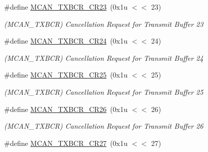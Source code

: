 \begin{DoxyCompactItemize}
\mbox{\label{group__SAME70__MCAN_gaf03469cd3780aad36986d2fe5558bab8}} 
\#define \mbox{\hyperlink{group__SAME70__MCAN_gaf03469cd3780aad36986d2fe5558bab8}{M\+C\+A\+N\+\_\+\+T\+X\+B\+C\+R\+\_\+\+C\+R23}}~(0x1u $<$$<$ 23)
\begin{DoxyCompactList}\small\item\em (M\+C\+A\+N\+\_\+\+T\+X\+B\+CR) Cancellation Request for Transmit Buffer 23 \end{DoxyCompactList}\item 
\mbox{\label{group__SAME70__MCAN_ga87a6441da81829d40259923fbcc69c5f}} 
\#define \mbox{\hyperlink{group__SAME70__MCAN_ga87a6441da81829d40259923fbcc69c5f}{M\+C\+A\+N\+\_\+\+T\+X\+B\+C\+R\+\_\+\+C\+R24}}~(0x1u $<$$<$ 24)
\begin{DoxyCompactList}\small\item\em (M\+C\+A\+N\+\_\+\+T\+X\+B\+CR) Cancellation Request for Transmit Buffer 24 \end{DoxyCompactList}\item 
\mbox{\label{group__SAME70__MCAN_gab7f087e923e079859bc8778455de726f}} 
\#define \mbox{\hyperlink{group__SAME70__MCAN_gab7f087e923e079859bc8778455de726f}{M\+C\+A\+N\+\_\+\+T\+X\+B\+C\+R\+\_\+\+C\+R25}}~(0x1u $<$$<$ 25)
\begin{DoxyCompactList}\small\item\em (M\+C\+A\+N\+\_\+\+T\+X\+B\+CR) Cancellation Request for Transmit Buffer 25 \end{DoxyCompactList}\item 
\mbox{\label{group__SAME70__MCAN_ga239e40bcf7c628803922fe76fe18f66a}} 
\#define \mbox{\hyperlink{group__SAME70__MCAN_ga239e40bcf7c628803922fe76fe18f66a}{M\+C\+A\+N\+\_\+\+T\+X\+B\+C\+R\+\_\+\+C\+R26}}~(0x1u $<$$<$ 26)
\begin{DoxyCompactList}\small\item\em (M\+C\+A\+N\+\_\+\+T\+X\+B\+CR) Cancellation Request for Transmit Buffer 26 \end{DoxyCompactList}\item 
\mbox{\label{group__SAME70__MCAN_gac959f97168bd268601a4f1ed3048a29c}} 
\#define \mbox{\hyperlink{group__SAME70__MCAN_gac959f97168bd268601a4f1ed3048a29c}{M\+C\+A\+N\+\_\+\+T\+X\+B\+C\+R\+\_\+\+C\+R27}}~(0x1u $<$$<$ 27)
$$
\end{DoxyCompactItemize}
